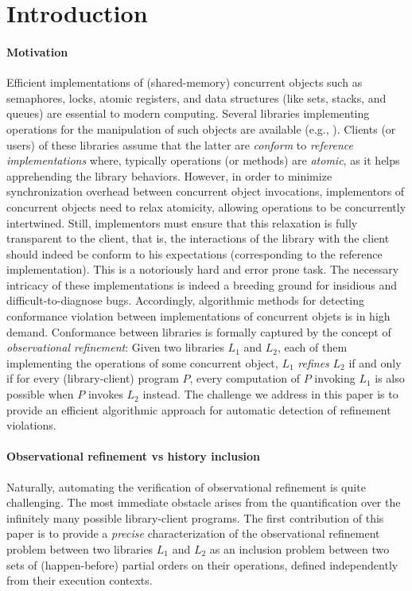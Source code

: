 \section{Introduction}

\paragraph{Motivation}

Efficient implementations of (shared-memory) concurrent objects such as
semaphores, locks, atomic registers, and data structures (like sets, stacks,
and queues) are essential to modern computing. Several libraries implementing
operations for the manipulation of such objects are available (e.g., \cite{}).
Clients (or users) of these libraries assume that the latter are \emph{conform}
to \emph{reference implementations} where, typically operations (or methods) are
\emph{atomic}, as it helps apprehending the library behaviors. However, in order
to minimize synchronization overhead between concurrent object invocations,
implementors of concurrent objects need to relax atomicity, allowing operations
to be concurrently intertwined. Still, implementors must ensure that this
relaxation is fully transparent to the client, that is, the interactions of the
library with the client should indeed be conform to his expectations
(corresponding to the reference implementation). This is a notoriously hard and
error prone task. The necessary intricacy of these implementations is indeed a
breeding ground for insidious and difficult-to-diagnose bugs. Accordingly,
algorithmic methods for detecting conformance violation between implementations
of concurrent objets is in high demand. Conformance between libraries is
formally captured by the concept of \emph{observational refinement}: Given two
libraries $L_1$ and $L_2$, each of them implementing the operations of some
concurrent object, $L_1$ \emph{refines} $L_2$ if and only if for every
(library-client) program $P$, every computation of $P$ invoking $L_1$ is also
possible when $P$ invokes $L_2$ instead. The challenge we address in this paper
is to provide an efficient algorithmic approach for automatic detection of
refinement violations.

\paragraph{Observational refinement vs history inclusion}

Naturally, automating the verification of observational refinement is quite
challenging. The most immediate obstacle arises from the quantification over
the infinitely many possible library-client programs. The first contribution of
this paper is to provide a \emph{precise} characterization of the observational
refinement problem between two libraries $L_1$ and $L_2$ as an inclusion
problem between two sets of (happen-before) partial orders on their operations,
defined independently from their execution contexts.

